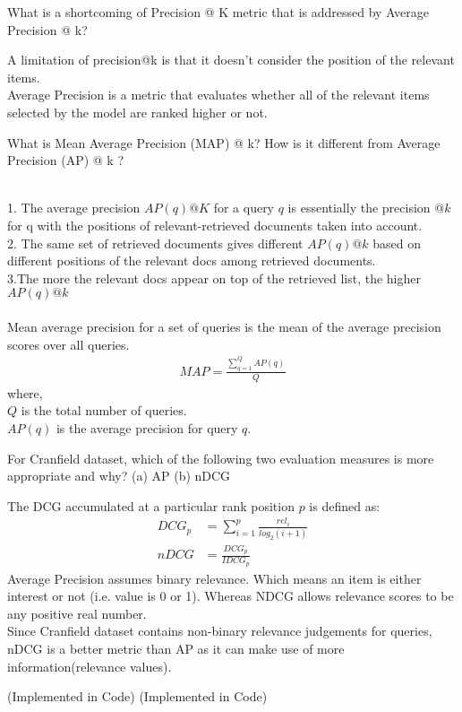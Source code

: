 \documentclass[11pt]{exam}
\begin{document}
\begin{questions}
\begin{solution}
\end{solution}
\question What is a shortcoming of Precision @ K metric that is addressed by Average Precision @
k?
\begin{solution}
    A limitation of precision@k is that it doesn’t consider the position of the relevant items.\\
    Average Precision is a metric that evaluates whether all of the relevant items selected by the model are ranked higher or not.\\
\end{solution}
\question What is Mean Average Precision (MAP) @ k? How is it different from Average Precision
(AP) @ k ?
\begin{solution}
    \\1. The average precision $AP(q)@K$ for a query $q$ is essentially the precision $@k$ for q with the positions of relevant-retrieved documents taken into account.\\
    2. The same set of retrieved documents gives different $AP(q)@k$ based on different positions of the relevant docs among retrieved documents.\\
    3.The more the relevant docs appear on top of the retrieved list, the higher $AP(q)@k$\\\\
    Mean average precision for a set of queries is the mean of the average precision scores over all queries. \\
    \begin{align}
        MAP = \frac{\sum_{q=1}^{Q}AP(q)}{Q}
    \end{align}
    where,\\
    $Q$ is the total number of queries. \\
    $AP(q)$ is the average precision for query $q$.
\end{solution}
\question For Cranfield dataset, which of the following two evaluation measures is more appropriate
and why? (a) AP (b) nDCG
\begin{solution}
    The DCG accumulated at a particular rank position $p$ is defined as:
    \begin{align}
        DCG_p &= \sum_{i=1}^{p}\frac{rel_i}{log_2(i+1)}\\
        nDCG &= \frac{DCG_p}{IDCG_p}
    \end{align}
    Average Precision assumes binary relevance. Which means an item is either interest or not (i.e. value is 0 or 1). Whereas NDCG allows relevance scores to be any positive real number.\\
    Since Cranfield dataset contains non-binary relevance judgements for queries, nDCG is a better metric than AP as it can make use of more information(relevance values).
\end{solution}
\question (Implemented in Code)
\question (Implemented in Code) %


\end{questions}
\end{document}
